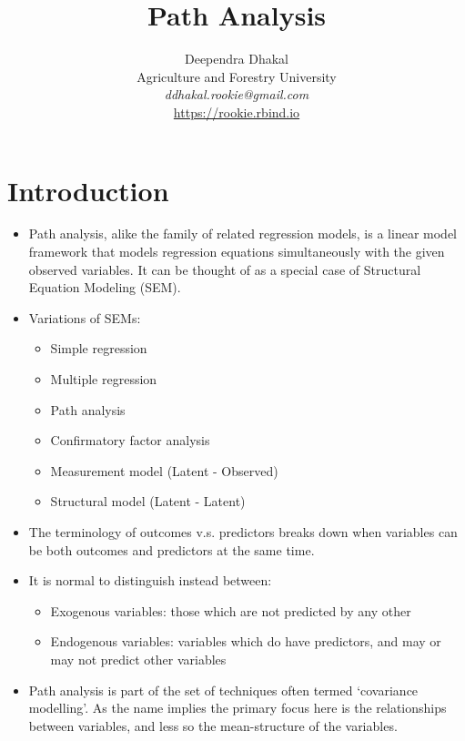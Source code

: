 \documentclass[11pt,dvipsnames,ignorenonframetext,aspectratio=169]{beamer}
\title[]{Path Analysis}
\author[
        Deependra Dhakal\\
Agriculture and Forestry University\\
\textit{ddhakal.rookie@gmail.com}\\
\url{https://rookie.rbind.io}
    ]{Deependra Dhakal\\
Agriculture and Forestry University\\
\textit{ddhakal.rookie@gmail.com}\\
\url{https://rookie.rbind.io}}
\date[
      
  ]{
    }
\providecommand{\tightlist}{%
  \setlength{\itemsep}{0pt}\setlength{\parskip}{0pt}}
\begin{document}
  \begin{frame}[plain]
  \titlepage
  \end{frame}



\hypertarget{introduction}{%
\section{Introduction}\label{introduction}}

\begin{frame}{}
\protect\hypertarget{section}{}
\begin{itemize}
\tightlist
\item
  Path analysis, alike the family of related regression models, is a
  linear model framework that models regression equations simultaneously
  with the given observed variables. It can be thought of as a special
  case of Structural Equation Modeling (SEM).
\item
  Variations of SEMs:

  \begin{itemize}
  \tightlist
  \item
    Simple regression
  \item
    Multiple regression
  \item
    Path analysis
  \item
    Confirmatory factor analysis
  \item
    Measurement model (Latent - Observed)
  \item
    Structural model (Latent - Latent)
  \end{itemize}
\end{itemize}
\end{frame}

\begin{frame}{}
\protect\hypertarget{section-1}{}
\begin{itemize}
\item
  The terminology of outcomes v.s. predictors breaks down when variables
  can be both outcomes and predictors at the same time.
\item
  It is normal to distinguish instead between:

  \begin{itemize}
  \tightlist
  \item
    Exogenous variables: those which are not predicted by any other
  \item
    Endogenous variables: variables which do have predictors, and may or
    may not predict other variables
  \end{itemize}
\item
  Path analysis is part of the set of techniques often termed
  `covariance modelling'. As the name implies the primary focus here is
  the relationships between variables, and less so the mean-structure of
  the variables.
\end{itemize}
\end{frame}
\end{document}
